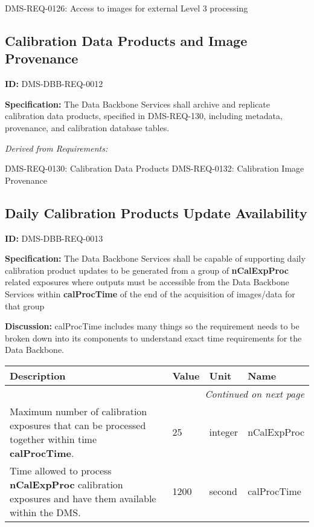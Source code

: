 \documentclass[SE,toc]{lsstdoc}
\makeatletter
\newcommand{\paramname}[1]{\hspace{0pt}#1}
\newcommand{\unitname}[1]{\hspace{0pt}#1}
\newenvironment{parameters}[0]{%
\setlength\LTleft{0pt}
\setlength\LTright{\fill}
\begin{small}
\begin{longtable}[]{|p{0.49\textwidth}|l|p{0.6in}|p{1.70in}@{}|}

\hline \textbf{Description} & \textbf{Value} & \textbf{Unit} & \textbf{Name} \\ \hline
\endhead

\hline \multicolumn{4}{r}{\emph{Continued on next page}} \\
\endfoot

\hline\hline
\endlastfoot
}{%
\hline
\end{longtable}
\end{small}
}
\makeatother
\begin{document}
DMS-REQ-0126:
Access to images for external Level 3 processing \newline

\subsection{Calibration Data Products and Image Provenance}

\label{DMS-DBB-REQ-0012}
\textbf{ID:} DMS-DBB-REQ-0012

\textbf{Specification:}
The Data Backbone Services shall archive and replicate calibration data products, specified in DMS-REQ-130, including metadata, provenance, and calibration database tables.

\emph{Derived from Requirements:}

DMS-REQ-0130:
Calibration Data Products \newline
DMS-REQ-0132:
Calibration Image Provenance \newline

\subsection{Daily Calibration Products Update Availability}

\label{DMS-DBB-REQ-0013}
\textbf{ID:} DMS-DBB-REQ-0013

\textbf{Specification:}
The Data Backbone Services shall be capable of supporting daily calibration product updates to be generated from a group of \textbf{nCalExpProc} related exposures where outputs must be accessible from the Data Backbone Services within \textbf{calProcTime} of the end of the acquisition of images/data for that group

\textbf{Discussion:}
calProcTime includes many things so the requirement needs to be broken down into its components to understand exact time requirements for the Data Backbone.

\begin{parameters}

Maximum number of calibration exposures that can be processed together within time \textbf{calProcTime}.

&
25
&
\unitname{%
integer
}
&
\paramname{%
nCalExpProc
} \\\hline
Time allowed to process \textbf{nCalExpProc} calibration exposures and have them available within the DMS.
&
1200
&
\unitname{%
second
}
&
\paramname{%
calProcTime
} \\\hline
\end{parameters}
\end{document}
